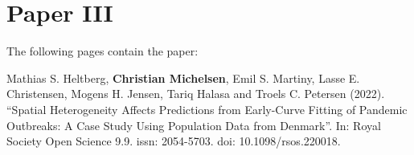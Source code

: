 \chapter{Paper III}
\label{chapter:covid19-agent-based-model}

The following pages contain the paper:
\vspace*{1cm}


Mathias S. Heltberg, \textbf{Christian Michelsen}, Emil S. Martiny, Lasse E. Christensen, Mogens H. Jensen, Tariq Halasa and Troels C. Petersen (2022). ``Spatial Heterogeneity Affects Predictions from Early-Curve Fitting of Pandemic Outbreaks: A Case Study Using Population Data from Denmark''. In: Royal Society Open Science 9.9. issn: 2054-5703. doi: 10.1098/rsos.220018.

\clearpage
